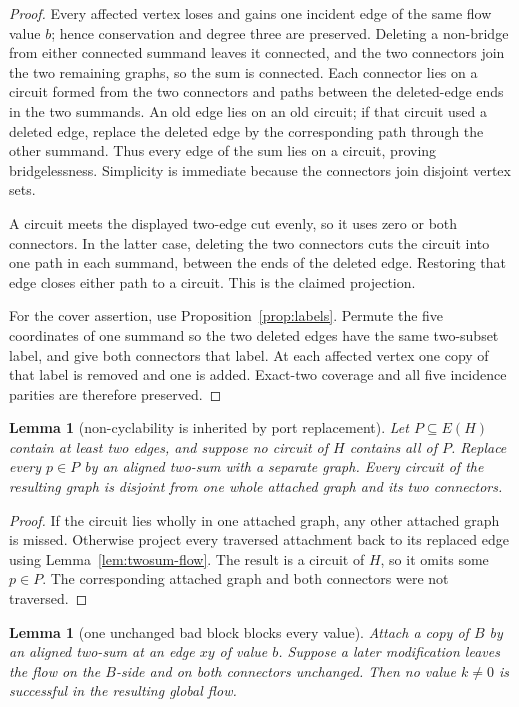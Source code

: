 \documentclass[11pt]{article}
\newtheorem{lemma}[theorem]{Lemma}
\theoremstyle{definition}
\theoremstyle{remark}
\begin{document}
\begin{proof}
Every affected vertex loses and gains one incident edge of the same flow
value \(b\); hence conservation and degree three are preserved.  Deleting
a non-bridge from either connected summand leaves it connected, and the
two connectors join the two remaining graphs, so the sum is connected.
Each connector lies on a circuit formed from the two connectors and
paths between the deleted-edge ends in the two summands.  An old edge
lies on an old circuit; if that circuit used a deleted edge, replace the
deleted edge by the corresponding path through the other summand.  Thus
every edge of the sum lies on a circuit, proving bridgelessness.
Simplicity is immediate because the connectors join disjoint vertex
sets.

A circuit meets the displayed two-edge cut evenly, so it uses zero or
both connectors.  In the latter case, deleting the two connectors cuts
the circuit into one path in each summand, between the ends of the
deleted edge.  Restoring that edge closes either path to a circuit.  This
is the claimed projection.

For the cover assertion, use Proposition~\ref{prop:labels}.  Permute the
five coordinates of one summand so the two deleted edges have the same
two-subset label, and give both connectors that label.  At each affected
vertex one copy of that label is removed and one is added.  Exact-two
coverage and all five incidence parities are therefore preserved.
\end{proof}

\begin{lemma}[non-cyclability is inherited by port replacement]
\label{lem:twosum-ports}
Let \(P\subseteq E(H)\) contain at least two edges, and suppose no circuit
of \(H\) contains all of \(P\).  Replace every \(p\in P\) by an aligned
two-sum with a separate graph.  Every circuit of the resulting graph is
disjoint from one whole attached graph and its two connectors.
\end{lemma}

\begin{proof}
If the circuit lies wholly in one attached graph, any other attached
graph is missed.  Otherwise project every traversed attachment back to
its replaced edge using Lemma~\ref{lem:twosum-flow}.  The result is a
circuit of \(H\), so it omits some \(p\in P\).  The corresponding
attached graph and both connectors were not traversed.
\end{proof}

\begin{lemma}[one unchanged bad block blocks every value]
\label{lem:twosum-block}
Attach a copy of \(B\) by an aligned two-sum at an edge \(xy\) of value
\(b\).  Suppose a later modification leaves the flow on the \(B\)-side
and on both connectors unchanged.  Then no value \(k\ne0\) is successful
in the resulting global flow.
\end{lemma}
\end{document}
